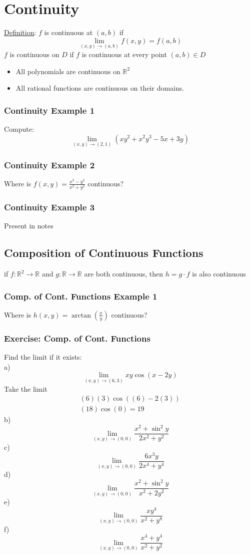 \documentclass[12pt]{article}
\begin{document}
\section{Continuity}
\underline{Definition}: \(f\) is continuous at \((a,b)\) if \[
	\lim_{(x,y) \to (a,b)} f(x,y) = f(a,b)
\]
\(f\) is continuous on \(D\) if \(f\) is continuous at every point \((a,b) \in D\) 
\begin{itemize}
	\item All polynomials are continuous on \(\mathbb{R}^2\) 
	\item All rational functions are continuous on their domains.
\end{itemize}
\subsubsection{Continuity Example 1}
Compute: \[
	\lim_{(x,y) \to (2,1)} (xy^2+x^2y^3-5x+3y)
\]
\subsubsection{Continuity Example 2}
Where is \(f(x,y) = \frac{x^2-y^2}{x^2+y^2}\) continuous?
\subsubsection{Continuity Example 3}
	Present in notes

\subsection{Composition of Continuous Functions}
if \(f:\mathbb{R}^2 \rightarrow \mathbb{R}\) and \(g:\mathbb{R}\rightarrow \mathbb{R}\) are both continuous, then \(h=g\cdot f \) is also continuous 
\subsubsection{Comp. of Cont. Functions Example 1}
Where is \(h(x,y)=\arctan(\frac{x}{y}) \) continuous?

\subsubsection{Exercise: Comp. of Cont. Functions}
Find the limit if it exists:\\
a) \[
	\lim_{(x,y) \to (6,3)} xy\cos(x-2y)
\]
Take the limit
\begin{align}
	(6)(3)\cos((6)-2(3))\\
	(18)\cos(0) = 19
\end{align}
b) \[
	\lim_{(x,y) \to (0,0)} \frac{x^2+\sin^2y}{2x^2 + y^2}
\]
c) \[
	\lim_{(x,y) \to (0,0)} \frac{6x^3y}{2x^4+y^4}
\]
d) \[
	\lim_{(x,y) \to (0,0)} \frac{x^2+\sin^2y}{x^2+2y^2}
\]
e) \[
	\lim_{(x,y) \to (0,0)} \frac{xy^4}{x^2+y^8}
\]
f) \[
	\lim_{(x,y) \to (0,0)} \frac{x^4+y^4}{x^2+y^2}
\] 
\end{document}
